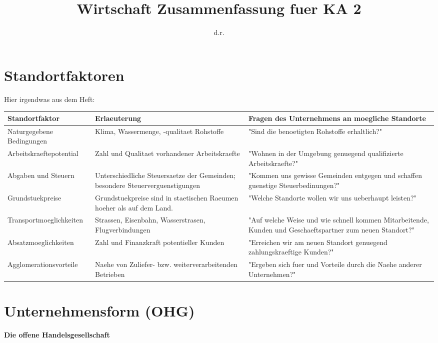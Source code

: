 \documentclass{article}
\title{Wirtschaft Zusammenfassung fuer KA 2}
\author{d.r.}
\begin{document}
\maketitle

\section{Standortfaktoren}
Hier irgendwas aus dem Heft:

\begin{table}[h]
\centering
\begin{tabular}{|p{4cm}|p{5cm}|p{6cm}|} 
\hline
\textbf{Standortfaktor} & \textbf{Erlaeuterung} & \textbf{Fragen des Unternehmens an moegliche Standorte} \\
\hline
Naturgegebene Bedingungen & Klima, Wassermenge, -qualitaet Rohstoffe & "Sind die benoetigten Rohstoffe erhaltlich?" \\ 
\hline
Arbeitskraeftepotential & Zahl und Qualitaet vorhandener Arbeitskraefte & "Wohnen in der Umgebung genuegend qualifizierte Arbeitskraefte?" \\
\hline
Abgaben und Steuern & Unterschiedliche Steuersaetze der Gemeinden; besondere Steuerverguenstigungen & "Kommen uns gewisse Gemeinden entgegen und schaffen guenstige Steuerbedinungen?" \\
\hline
Grundstuekpreise & Grundstuekpreise sind in staetischen Raeumen hoeher als auf dem Land. & "Welche Standorte wollen wir uns ueberhaupt leisten?" \\
\hline
Transportmoeglichkeiten & Strassen, Eisenbahn, Wasserstrasen, Flugverbindungen & "Auf welche Weise und wie schnell kommen Mitarbeitende, Kunden und Geschaeftspartner zum neuen Standort?" \\
\hline
Absatzmoeglichkeiten & Zahl und Finanzkraft potentieller Kunden & "Erreichen wir am neuen Standort genuegend zahlungskraeftige Kunden?" \\
\hline
Agglomerationsvorteile & Naehe von Zuliefer- bzw. weiterverarbeitenden Betrieben & "Ergeben sich fuer und Vorteile durch die Naehe anderer Unternehmen?"\\
\hline
\end{tabular}
\end{table}

\section{Unternehmensform (OHG)}

\textbf{Die offene Handelsgesellschaft} 
\end{document}
